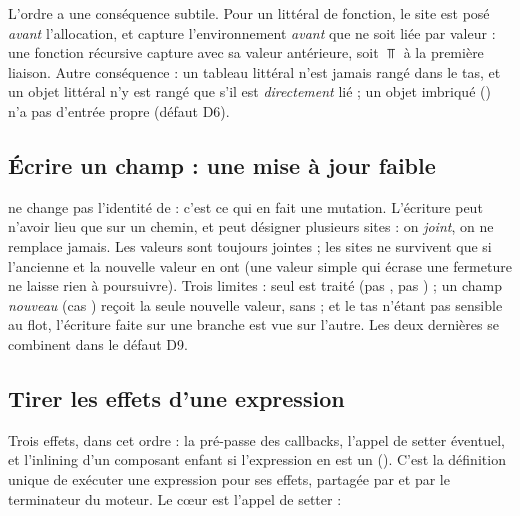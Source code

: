 L'ordre a une conséquence subtile. Pour un littéral de fonction, le site est
posé \emph{avant} l'allocation, et  capture l'environnement
\emph{avant} que  ne soit liée par valeur : une fonction récursive
 capture  avec sa valeur antérieure, soit
$\Top$ à la première liaison. Autre conséquence : un tableau littéral n'est
jamais rangé dans le tas, et un objet littéral n'y est rangé que s'il est
\emph{directement} lié ; un objet imbriqué () n'a
pas d'entrée propre (défaut D6).

\subsection{Écrire un champ : une mise à jour faible}


 ne change pas l'identité de  : c'est ce qui en
fait une mutation. L'écriture peut n'avoir lieu que sur un chemin, et
 peut désigner plusieurs sites : on \emph{joint}, on ne remplace
jamais. Les valeurs sont toujours jointes ; les sites ne survivent que si
l'ancienne et la nouvelle valeur en ont (une valeur simple qui écrase une
fermeture ne laisse rien à poursuivre). Trois limites : seul
 est traité (pas , pas
) ; un champ \emph{nouveau} (cas ) reçoit
la seule nouvelle valeur, sans  ; et le tas n'étant pas
sensible au flot, l'écriture faite sur une branche est vue sur l'autre. Les
deux dernières se combinent dans le défaut D9.

\subsection{Tirer les effets d'une expression}


Trois effets, dans cet ordre : la pré-passe des callbacks, l'appel de setter
éventuel, et l'inlining d'un composant enfant si l'expression en est un
(). C'est la définition unique de \og exécuter une
expression pour ses effets\fg{}, partagée par  et par le
terminateur  du moteur. Le cœur est l'appel de setter :


